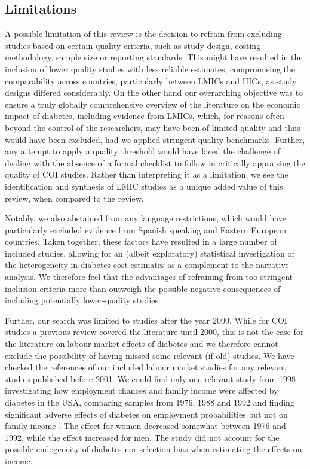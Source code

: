 \subsection{Limitations}
A possible limitation of this review is the decision to refrain from excluding studies based on certain quality criteria, such as study design, costing methodology, sample size or reporting standards. This might have resulted in the inclusion of lower quality studies with less reliable estimates, compromising the comparability across countries, particularly between \acp{LMIC} and \acp{HIC}, as study designs differed considerably. On the other hand our overarching objective was to ensure a truly globally comprehensive overview of the literature on the economic impact of diabetes, including evidence from \acp{LMIC}, which, for reasons often beyond the control of the researchers, may have been of limited quality and thus would have been excluded, had we applied stringent quality benchmarks. Further, any attempt to apply a quality threshold would have faced the challenge of dealing with the absence of a formal checklist to follow in critically appraising the quality of \ac{COI} studies. Rather than interpreting it as a limitation, we see the identification and synthesis of \ac{LMIC} studies as a unique added value of this review, when compared to the \textcite{Ettaro2004} review. 

Notably, we also abstained from any language restrictions, which would have particularly excluded evidence from Spanish speaking and Eastern European countries. Taken together, these factors have resulted in a large number of included studies, allowing for an (albeit exploratory) statistical investigation of the heterogeneity in diabetes cost estimates as a complement to the narrative analysis. We therefore feel that the advantages of refraining from too stringent inclusion criteria more than outweigh the possible negative consequences of including potentially lower-quality studies.

Further, our search was limited to studies after the year 2000. While for \ac{COI} studies a previous review covered the literature until 2000, this is not the case for the literature on labour market effects of diabetes and we therefore cannot exclude the possibility of having missed some relevant (if old) studies. We have checked the references of our included labour market
studies for any relevant studies published before 2001. We could find only one relevant study from 1998 investigating how employment
chances and family income were affected by diabetes in the USA, comparing samples from 1976, 1988 and 1992 and finding significant
adverse effects of diabetes on employment probabilities but not on family income \parencite{Kahn1998b}. The effect for women decreased somewhat between 1976 and 1992, while the effect increased for men. The study did not account for the possible endogeneity of diabetes nor selection bias when estimating the effects on income.

